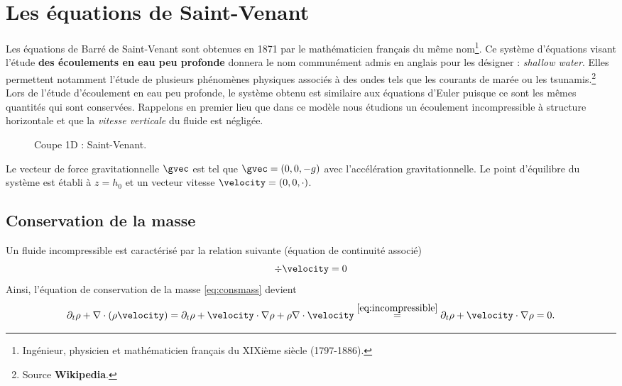 \section{Les équations de Saint-Venant}\label{sec:SaintVenant}
Les équations de Barré de Saint-Venant sont obtenues en 1871 par le mathématicien français du même nom\footnote{Ingénieur, physicien et mathématicien français du XIXième siècle (1797-1886).}.  Ce système d'équations visant l'étude \textbf{des écoulements en eau peu profonde} donnera le nom communément admis en anglais pour les désigner : \textit{shallow water}. Elles permettent notamment l'étude de plusieurs phénomènes physiques associés à des ondes tels que les courants de marée ou les tsunamis.\footnote{Source \textbf{Wikipedia}.}\\ 

Lors de l'étude d'écoulement en eau peu profonde, le système obtenu est similaire aux équations d'Euler puisque ce sont les mêmes quantités qui sont conservées. Rappelons en premier lieu que dans ce modèle nous étudions un écoulement incompressible à structure horizontale et que la \textit{vitesse verticale} du fluide est négligée.\\

\begin{figure}
	\centering
	\caption{Coupe 1D : Saint-Venant.}
	\label{fig:SaintVenant}
\end{figure}

\noindent Le vecteur de force gravitationnelle $\gvec$ est tel que $\gvec  = \left(0, 0, -g\right)$ avec l'accélération gravitationnelle. Le point d'équilibre du système est établi à $z = h_0$ et un vecteur vitesse $\velocity = \left(0, 0, \cdot\right)$.\\

\subsection{Conservation de la masse}
Un fluide incompressible est caractérisé par la relation suivante (équation de continuité associé)
\begin{equation}
	\div \velocity = 0\label{eq:incompressible}
\end{equation}
Ainsi, l'équation de conservation de la masse \eqref{eq:consmass} devient
\begin{equation}
	\partial_t \rho + \nabla \cdot \left(\rho \velocity \right) = \partial_t \rho + \velocity \cdot \nabla \rho  + \rho \nabla \cdot \velocity \overset{\eqref{eq:incompressible}}{=} \partial_t \rho + \velocity \cdot \nabla \rho =  0.\label{eq:consmassSW}
\end{equation}

